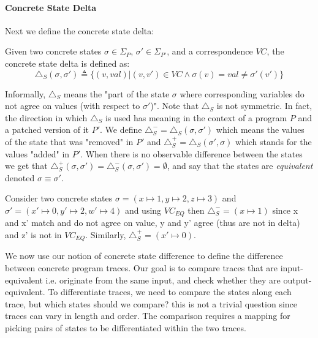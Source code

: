 \paragraph{Concrete State Delta}
Next we define the concrete state delta:
\begin{definition} 
Given two concrete states $\sigma \in \Sigma_{P}$, $\sigma' \in \Sigma_{P'}$, and a correspondence $VC$, the concrete state delta is defined as:
\[
\triangle_{S}(\sigma,\sigma') \triangleq \{ (v,val) | (v,v') \in VC \wedge \sigma(v) = val \neq \sigma'(v')\}
\]
\end{definition}
Informally, $\triangle_{S}$ means the "part of the state $\sigma$ where corresponding variables do not agree on values (with respect to $\sigma'$)". Note that $\triangle_{S}$ is not symmetric. In fact, the direction in which $\triangle_{S}$ is used has meaning in the context of a program $P$ and a patched version of it $P'$. We define $\triangle_{S}^{-} = \triangle_{S}(\sigma,\sigma')$ which means the values of the state that was "removed" in $P'$ and $\triangle_{S}^{+} = \triangle_{S}(\sigma',\sigma)$ which stands for the values "added" in $P'$. When there is no observable difference between the states we get that $\triangle_{S}^{+}(\sigma,\sigma')= \triangle_{S}^{-}(\sigma,\sigma') = \emptyset$, and say that the states are \emph{equivalent} denoted $\sigma \equiv \sigma'$.

\begin{Example}
Consider two concrete states $\sigma = (x \mapsto 1,y \mapsto 2,z \mapsto 3)$ and $\sigma' = (x' \mapsto 0,y' \mapsto 2,w' \mapsto 4)$ and using $VC_{EQ}$ then $\triangle_{S}^{-} = (x \mapsto 1)$ since x and x' match and do not agree on value, y and y' agree (thus are not in delta) and z' is not in $VC_{EQ}$. Similarly, $\triangle_{S}^{+} = (x' \mapsto 0)$. %
\end{Example}

We now use our notion of concrete state difference to define the difference between concrete program traces. Our goal is to compare traces that are input-equivalent i.e. originate from the same input, and check whether they are output-equivalent.
To differentiate traces, we need to compare the states along each trace, but which states should we compare? this is not a trivial question since traces can vary in length and order. The comparison requires a mapping for picking pairs of states to be differentiated within the two traces.

